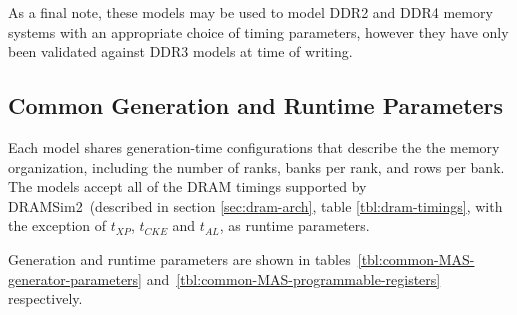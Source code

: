 As a final note, these models may be used to model DDR2 and DDR4 memory systems with an
appropriate choice of timing parameters, however they have only been validated
against DDR3 models at time of writing.

\subsection{Common Generation and Runtime Parameters}

Each model shares generation-time configurations that describe the
the memory organization, including the number of ranks,
banks per rank, and rows per bank. The models accept all of the DRAM timings supported by DRAMSim2~(described in
section \ref{sec:dram-arch}, table \ref{tbl:dram-timings}, with the exception
of $t_{XP}$, $t_{CKE}$ and $t_{AL}$, as runtime parameters.

\noindent Generation and runtime parameters are shown in
tables~\ref{tbl:common-MAS-generator-parameters}
and~\ref{tbl:common-MAS-programmable-registers}
respectively.

\begin{table}[htb]
\begin{center}
\end{center}
\caption{Common generation parameters of the DDR3 MAS models.}
\label{tbl:common-MAS-generator-parameters}
\end{table}%

